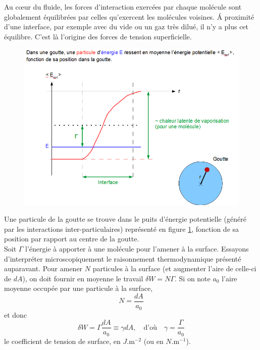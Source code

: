 \documentclass[11pt,a4paper]{report}
\begin{document}
Au cœur du fluide, les forces d'interaction exercées par chaque molécule sont globalement équilibrées par celles qu'exercent les molécules voisines. \'A proximité d'une interface, par exemple avec du vide ou un gaz très dilué, il n'y a plus cet équilibre. C'est là l'origine des forces de tension superficielle.

\begin{figure}[h!]
\begin{center}
	\includegraphics[scale = 0.5]{interp_micro.png} 
	\label{fig:interp_micro}
\end{center}
\end{figure}

Une particule de la goutte se trouve dans le puits d'énergie potentielle (généré par les interactions inter-particulaires) représenté en figure \ref{fig:interp_micro}, fonction de sa position par rapport au centre de la goutte.\\

Soit $\Gamma$ l'énergie à apporter à une molécule pour l'amener à la surface. Essayons d'interpréter microscopiquement le raisonnement thermodynamique présenté auparavant. Pour amener $N$ particules à la surface (et augmenter l'aire de celle-ci de $dA$), on doit fournir en moyenne le travail $\delta W = N\Gamma$. Si on note $a_0$ l'aire moyenne occupée par une particule à la surface,
\begin{equation}
	N = \frac{dA}{a_0}
\end{equation}
et donc 
\begin{equation}
	\delta W = \Gamma \frac{dA}{a_0} \equiv \gamma dA,\quad\text{d'où}\quad \gamma = \frac{\Gamma}{a_0}
\end{equation}
le coefficient de tension de surface, en $J.\text{m}^{-2}$ (ou en $N.\text{m}^{-1}$).\\
\end{document}
